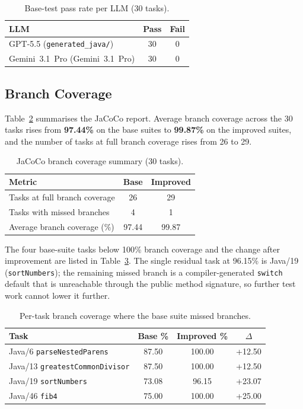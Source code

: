 \documentclass[journal]{IEEEtran}
\begin{document}
\begin{table}[!t]
\centering
\caption{Base-test pass rate per LLM (30 tasks).}
\label{tab:basepass}
\renewcommand{\arraystretch}{1.15}
\begin{tabular}{@{}l c c@{}}
\toprule
\textbf{LLM} & \textbf{Pass} & \textbf{Fail} \\
\midrule
GPT-5.5 (\texttt{generated\_java/}) & 30 & 0 \\
Gemini~3.1~Pro (Gemini~3.1~Pro)            & 30 & 0 \\
\bottomrule
\end{tabular}
\end{table}

\subsection{Branch Coverage}
Table~\ref{tab:cov} summarises the JaCoCo report. Average
branch coverage across the 30 tasks rises from
\textbf{97.44\%} on the base suites to \textbf{99.87\%} on the
improved suites, and the number of tasks at full branch
coverage rises from 26 to 29.

\begin{table}[!t]
\centering
\caption{JaCoCo branch coverage summary (30 tasks).}
\label{tab:cov}
\renewcommand{\arraystretch}{1.15}
\begin{tabular}{@{}l c c@{}}
\toprule
\textbf{Metric} & \textbf{Base} & \textbf{Improved} \\
\midrule
Tasks at full branch coverage    & 26    & 29    \\
Tasks with missed branches       & 4     & 1     \\
Average branch coverage (\%)     & 97.44 & 99.87 \\
\bottomrule
\end{tabular}
\end{table}

The four base-suite tasks below 100\% branch coverage and the
change after improvement are listed in
Table~\ref{tab:covdelta}. The single residual task at 96.15\%
is Java/19 (\texttt{sortNumbers}); the remaining missed branch
is a compiler-generated \texttt{switch} default that is
unreachable through the public method signature, so further
test work cannot lower it further.

\begin{table}[!t]
\centering
\caption{Per-task branch coverage where the base suite missed
branches.}
\label{tab:covdelta}
\renewcommand{\arraystretch}{1.15}
\begin{tabular}{@{}l c c c@{}}
\toprule
\textbf{Task} & \textbf{Base \%} & \textbf{Improved \%}
              & \boldmath$\Delta$ \\
\midrule
Java/6  \texttt{parseNestedParens}      & 87.50 & 100.00 & +12.50 \\
Java/13 \texttt{greatestCommonDivisor}  & 87.50 & 100.00 & +12.50 \\
Java/19 \texttt{sortNumbers}            & 73.08 & 96.15  & +23.07 \\
Java/46 \texttt{fib4}                   & 75.00 & 100.00 & +25.00 \\
\bottomrule
\end{tabular}
\end{table}
\end{document}
